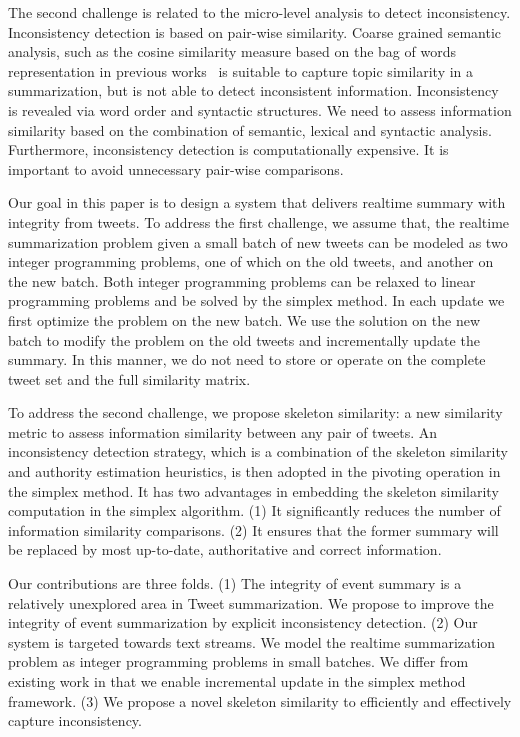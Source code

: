 \documentclass{llncs}
\begin{document}
The second challenge is related to the micro-level analysis to detect inconsistency. Inconsistency detection is based on pair-wise similarity. Coarse grained semantic analysis, such as the cosine similarity measure based on the bag of words representation in previous works~\cite{} is suitable to capture topic similarity in a summarization, but is not able to detect inconsistent information. Inconsistency is revealed via word order and syntactic structures. We need to assess information similarity based on the combination of semantic, lexical and syntactic analysis. Furthermore, inconsistency detection is computationally expensive. It is important to avoid unnecessary pair-wise comparisons.

Our goal in this paper is to design a system that delivers realtime summary with integrity from tweets. To address the first challenge, we assume that, the realtime summarization problem given a small batch of new tweets can be modeled as two integer programming problems, one of which on the old tweets, and another on the new batch. Both integer programming problems can be relaxed to linear programming problems and be solved by the simplex method. In each update we first optimize the problem on the new batch. We use the solution on the new batch to modify the problem on the old tweets and incrementally update the summary.  In this manner, we do not need to store or operate on the complete tweet set and the full similarity matrix.


To address the second challenge, we propose skeleton similarity: a new similarity metric to assess information similarity between any pair of tweets. An inconsistency detection strategy, which is a combination of the skeleton similarity and authority estimation heuristics, is then adopted in the pivoting operation in the simplex method. It has two advantages in embedding the skeleton similarity computation in the simplex algorithm. (1) It significantly reduces the number of information similarity comparisons. (2) It ensures that the former summary will be replaced by most up-to-date, authoritative and correct information.


Our contributions are three folds. (1) The integrity of event summary is a relatively unexplored area in Tweet summarization. We propose to improve the integrity of event summarization by explicit inconsistency detection. (2) Our system is targeted towards text streams. We model the realtime summarization problem as integer programming problems in small batches. We differ from existing work in that we enable incremental update in the simplex method framework. (3) We propose a novel skeleton similarity to efficiently and effectively capture inconsistency.
\end{document}
